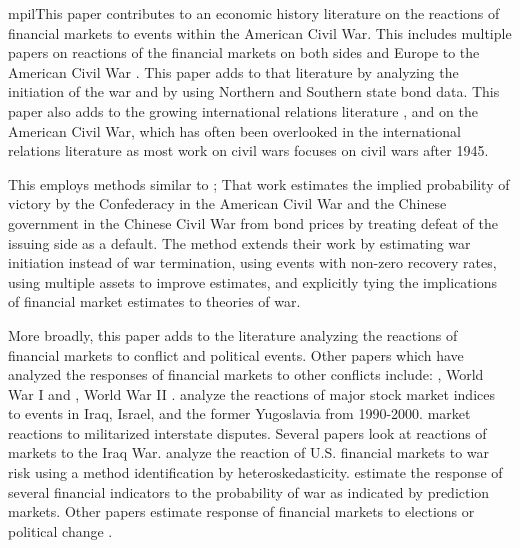 mpilThis paper contributes to an economic history literature on the reactions of financial markets to events within the American Civil War.
This includes multiple papers on reactions of the financial markets on both sides and Europe to the American Civil War \textcites{Schwab1901}{Mitchell1903}{WillardGuinnaneEtAl1996}{McCandless1996}{SmithSmith1997}{BrownBurdekin2000}{Weidenmier2002}.
This paper adds to that literature by analyzing the initiation of the war and by using Northern and Southern state bond data.
This paper also adds to the growing international relations literature \textcite{Poast2012}, and \textcite{Reiter2009} on the American Civil War, which has often been overlooked in the international relations literature as most work on civil wars focuses on civil wars after 1945.

This employs methods similar to \textcite{HaberMitchenerOosterlinckEtAl2015};
That work estimates the implied probability of victory by the Confederacy in the American Civil War and the Chinese government in the Chinese Civil War from bond prices by treating defeat of the issuing side as a default.
The method extends their work by estimating war initiation instead of war termination, using events with non-zero recovery rates, using multiple assets to improve estimates, and explicitly tying the implications of financial market estimates to theories of war.

More broadly, this paper adds to the literature analyzing the reactions of financial markets to conflict and political events.
Other papers which have analyzed the responses of financial markets to other conflicts include:  \textcite{Bueno1990}, World War I \textcite{Hall2004} and \textcite{Ferguson2006}, World War II \textcites{WaldenstromFrey2008}{WaldenstromFrey2008}.
\textcite{SchneiderTroeger2006} analyze the reactions of major stock market indices to events in Iraq, Israel, and the former Yugoslavia from 1990-2000.
\textcite{GuidolinLaFerrara2010} market reactions to militarized interstate disputes.
Several papers look at reactions of markets to the Iraq War.
\textcite{RigobonSack2005} analyze the reaction of U.S. financial markets to war risk using a method identification by heteroskedasticity.
\textcites{LeighWolfersEtAl2003}{WolfersZitzewitz2009} estimate the response of several financial indicators to the probability of war as indicated by prediction markets.
Other papers estimate response of financial markets to elections or political change \parencites{Jayachandr2006}{Herron2000}.




